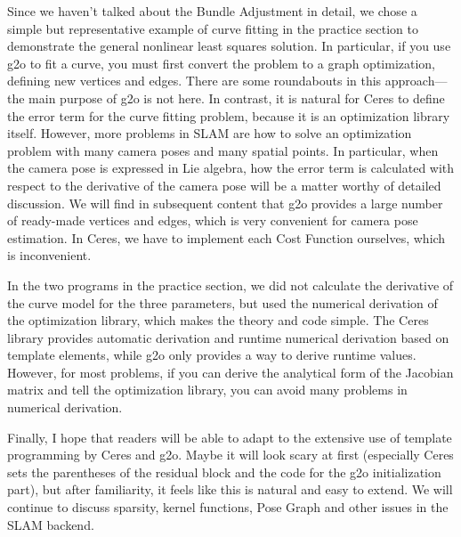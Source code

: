 Since we haven't talked about the Bundle Adjustment in detail, we chose a simple but representative example of curve fitting in the practice section to demonstrate the general nonlinear least squares solution. In particular, if you use g2o to fit a curve, you must first convert the problem to a graph optimization, defining new vertices and edges. There are some roundabouts in this approach—the main purpose of g2o is not here. In contrast, it is natural for Ceres to define the error term for the curve fitting problem, because it is an optimization library itself. However, more problems in SLAM are how to solve an optimization problem with many camera poses and many spatial points. In particular, when the camera pose is expressed in Lie algebra, how the error term is calculated with respect to the derivative of the camera pose will be a matter worthy of detailed discussion. We will find in subsequent content that g2o provides a large number of ready-made vertices and edges, which is very convenient for camera pose estimation. In Ceres, we have to implement each Cost Function ourselves, which is inconvenient.

In the two programs in the practice section, we did not calculate the derivative of the curve model for the three parameters, but used the numerical derivation of the optimization library, which makes the theory and code simple. The Ceres library provides automatic derivation and runtime numerical derivation based on template elements, while g2o only provides a way to derive runtime values. However, for most problems, if you can derive the analytical form of the Jacobian matrix and tell the optimization library, you can avoid many problems in numerical derivation.

Finally, I hope that readers will be able to adapt to the extensive use of template programming by Ceres and g2o. Maybe it will look scary at first (especially Ceres sets the parentheses of the residual block and the code for the g2o initialization part), but after familiarity, it feels like this is natural and easy to extend. We will continue to discuss sparsity, kernel functions, Pose Graph and other issues in the SLAM backend.
